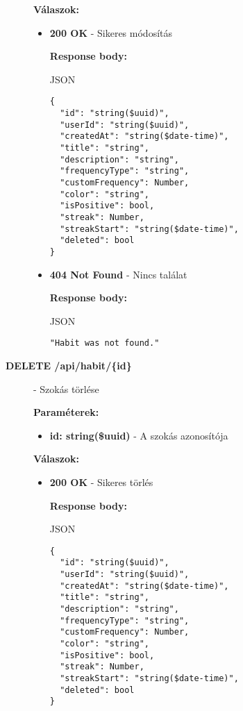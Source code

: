 \documentclass[12pt]{report}
\begin{document}
\begin{description}
    \vspace{0.5cm}
    \textbf{Válaszok:}
    \begin{itemize}
      \item \textbf{200 OK} - Sikeres módosítás

        \textbf{Response body:}
        \begin{codeblock}{JSON}
          \begin{verbatim}
{
  "id": "string($uuid)",
  "userId": "string($uuid)",
  "createdAt": "string($date-time)",
  "title": "string",
  "description": "string",
  "frequencyType": "string",
  "customFrequency": Number,
  "color": "string",
  "isPositive": bool,
  "streak": Number,
  "streakStart": "string($date-time)",
  "deleted": bool
}
          \end{verbatim}
        \end{codeblock}
    
      \item \textbf{404 Not Found} - Nincs találat

        \textbf{Response body:}
        \begin{codeblock}{JSON}
          \begin{verbatim}
"Habit was not found."
          \end{verbatim}
        \end{codeblock}
    \end{itemize}

  \item[\textbf{DELETE /api/habit/\{id\}}] - Szokás törlése
  
    \vspace{0.5cm}
    \textbf{Paraméterek:}
    \begin{itemize}
      \item \textbf{id: string(\$uuid)} - A szokás azonosítója
    \end{itemize}

    \vspace{0.5cm}
    \textbf{Válaszok:}
    \begin{itemize}
      \item \textbf{200 OK} - Sikeres törlés

        \textbf{Response body:}
        \begin{codeblock}{JSON}
          \begin{verbatim}
{
  "id": "string($uuid)",
  "userId": "string($uuid)",
  "createdAt": "string($date-time)",
  "title": "string",
  "description": "string",
  "frequencyType": "string",
  "customFrequency": Number,
  "color": "string",
  "isPositive": bool,
  "streak": Number,
  "streakStart": "string($date-time)",
  "deleted": bool
}
          \end{verbatim}
        \end{codeblock}


\end{itemize}
\end{description}
\end{document}
